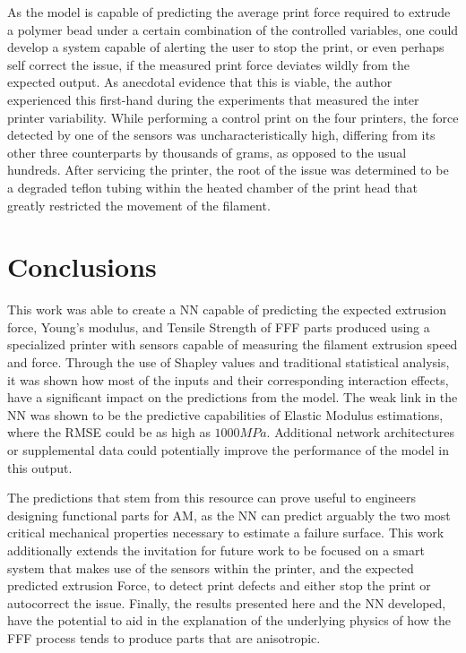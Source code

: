 \documentclass[main.tex]{subfiles}
\begin{document}
As the model is capable of predicting the average print force required to extrude a polymer bead under a certain combination of the controlled variables, one could develop a system capable of alerting the user to stop the print, or even perhaps self correct the issue, if the measured print force deviates wildly from the expected output. As anecdotal evidence that this is viable, the author experienced this first-hand during the experiments that measured the inter printer variability. While performing a control print on the four printers, the force detected by one of the sensors was uncharacteristically high, differing from its other three counterparts by thousands of grams, as opposed to the usual hundreds. After servicing the printer, the root of the issue was determined to be a degraded teflon tubing within the heated chamber of the print head that greatly restricted the movement of the filament. 

\section{Conclusions}

This work was able to create a NN capable of predicting the expected extrusion force, Young's modulus, and Tensile Strength of FFF parts produced using a specialized printer with sensors capable of measuring the filament extrusion speed and force. Through the use of Shapley values and traditional statistical analysis, it was shown how most of the inputs and their corresponding interaction effects, have a significant impact on the predictions from the model. The weak link in the NN was shown to be the predictive capabilities of Elastic Modulus estimations, where the RMSE could be as high as $1000 MPa$. Additional network architectures or supplemental data could potentially improve the performance of the model in this output. 

The predictions that stem from this resource can prove useful to engineers designing functional parts for AM, as the NN can predict arguably the two most critical mechanical properties necessary to estimate a failure surface. This work additionally extends the invitation for future work to be focused on a smart system that makes use of the sensors within the printer, and the expected predicted extrusion Force, to detect print defects and either stop the print or autocorrect the issue. Finally, the results presented here and the NN developed, have the potential to aid in the explanation of the underlying physics of how the FFF process tends to produce parts that are anisotropic.
\end{document}
